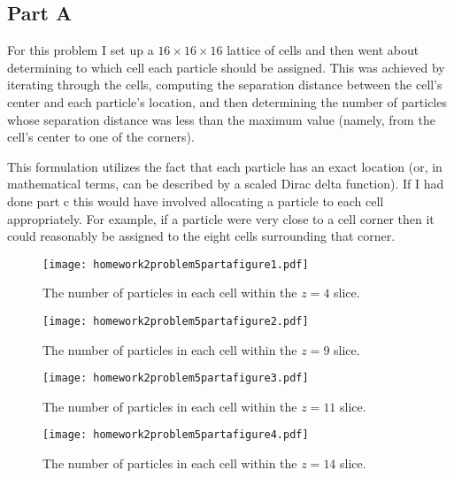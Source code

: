 \subsection{Part A}

For this problem I set up a $16\times 16\times 16$ lattice of cells and then went about determining to which cell each particle should be assigned. This was achieved by iterating through the cells, computing the separation distance between the cell's center and each particle's location, and then determining the number of particles whose separation distance was less than the maximum value (namely, from the cell's center to one of the corners). 

This formulation utilizes the fact that each particle has an exact location (or, in mathematical terms, can be described by a scaled Dirac delta function). If I had done part c this would have involved allocating a particle to each cell appropriately. For example, if a particle were very close to a cell corner then it could reasonably be assigned to the eight cells surrounding that corner.



\clearpage

\begin{figure}[h]
    \centering
    \texttt{[image: homework2problem5partafigure1.pdf]}
    \caption{The number of particles in each cell within the $z=4$ slice.}
    \label{fig:25a1}
\end{figure}

\begin{figure}[h]
    \centering
    \texttt{[image: homework2problem5partafigure2.pdf]}
    \caption{The number of particles in each cell within the $z=9$ slice.}
    \label{fig:25a2}
\end{figure}

\begin{figure}[h]
    \centering
    \texttt{[image: homework2problem5partafigure3.pdf]}
    \caption{The number of particles in each cell within the $z=11$ slice.}
    \label{fig:25a3}
\end{figure}

\begin{figure}[h]
    \centering
    \texttt{[image: homework2problem5partafigure4.pdf]}
    \caption{The number of particles in each cell within the $z=14$ slice.}
    \label{fig:25a4}
\end{figure}


\clearpage
